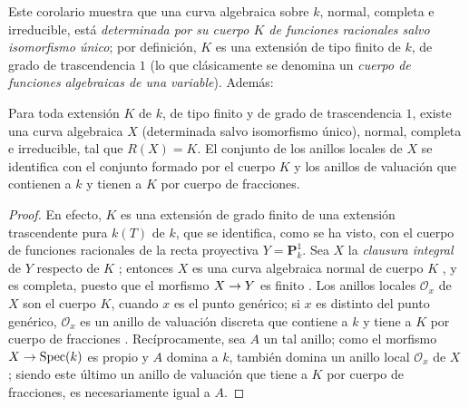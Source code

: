 \documentclass[oneside,10pt]{amsart}
\makeatletter
\newcommand{\ega@arrow}[2]{\mathchoice{#1}{#2}{#2}{#2}}
\renewcommand{\to}{\ega@arrow{\longrightarrow}{\rightarrow}}
\let\EGAOriginalLabel\label
\renewcommand{\label}[1]{\phantomsection\EGAOriginalLabel{#1}}
\makeatother
\begin{document}
\begin{env}[7.4.17]
\label{II.7.4.17-fr}
Este corolario  muestra que una curva algebraica sobre $k$, normal, completa e irreducible, está \emph{determinada por su cuerpo $K$ de funciones racionales salvo isomorfismo único};
por definición, $K$ es una extensión de tipo finito de $k$, de grado de trascendencia $1$ (lo que clásicamente se denomina un \emph{cuerpo de funciones algebraicas de una variable}).
Además:
\end{env}

\begin{proposition}[7.4.18]
\label{II.7.4.18-fr}
Para toda extensión $K$ de $k$, de tipo finito y de grado de trascendencia $1$, existe una curva algebraica $X$ (determinada salvo isomorfismo único), normal, completa e irreducible, tal que $R(X)=K$.
El conjunto de los anillos locales de $X$ se identifica  con el conjunto formado por el cuerpo $K$ y los anillos de valuación que contienen a $k$ y tienen a $K$ por cuerpo de fracciones.
\end{proposition}

\begin{proof}
En efecto, $K$ es una extensión de grado finito de una extensión trascendente pura $k(T)$ de $k$, que se identifica, como se ha visto, con el cuerpo de funciones racionales de la recta proyectiva $Y=\mathbf{P}_k^1$.
Sea $X$ la \emph{clausura integral} de $Y$ respecto de $K$ ;
entonces $X$ es una curva algebraica normal de cuerpo $K$ , y es completa, puesto que el morfismo $X\to Y$ es finito .
Los anillos locales $\mathcal{O}_x$ de $X$ son el cuerpo $K$, cuando $x$ es el punto genérico; si $x$ es distinto del punto genérico, $\mathcal{O}_x$ es un anillo de valuación discreta que contiene a $k$ y tiene a $K$ por cuerpo de fracciones .
Recíprocamente, sea $A$ un tal anillo;
como el morfismo $X\to\operatorname{Spec}(k)$ es propio y $A$ domina a $k$, también domina un anillo local $\mathcal{O}_x$ de $X$ ;
siendo este último un anillo de valuación que tiene a $K$ por cuerpo de fracciones, es necesariamente igual a $A$.
\end{proof}
\end{document}
